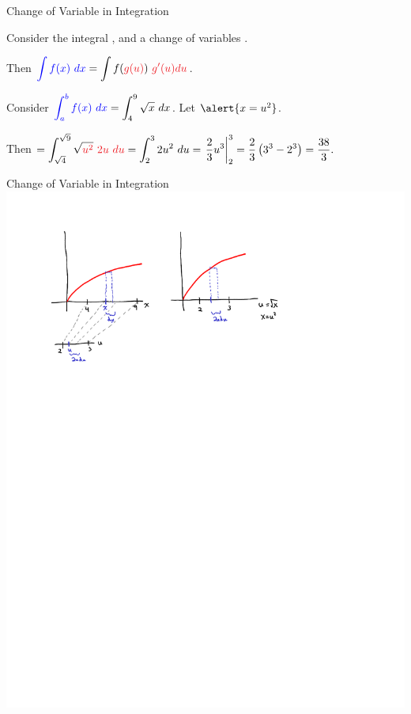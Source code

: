\documentclass[xcolor=dvipsnames,aspectratio=169,t]{beamer}
\begin{document}
\begin{frame}{Change of Variable in Integration}
  \bigskip
  
  Consider the integral , and a change of variables .
  \bigskip
  
  \pause
  \qquad Then $\displaystyle \colorb{\int f(x) \ dx}= \int f(\colorr{g(u)}) \ \colorr{g'(u) du}$.
  \vspace*{1.5em}
  
  \pause
  Consider $\displaystyle\textcolor{blue}{\int_a^b f(x) \ dx}=\int_4^9 \sqrt{x} \ dx$.
  Let $\alert{x=u^2}$.
  \medskip
  
  \quad Then $=\displaystyle \int_{\sqrt{4}}^{\sqrt{9}} \sqrt{\colorr{u^2}} \ \colorr{2u \ du}
              = \int_{2}^{3} 2u^2 \ du
              = \left. \frac{2}{3}u^3 \right|_{2}^{3}
              = \frac{2}{3}\left(3^3 - 2^3\right) = \frac{38}{3}.$
\end{frame}

\begin{frame}{Change of Variable in Integration}
  \includegraphics[clip,trim=1cm 0 0 5em]{images/ChangeOfVar.pdf}  %
\end{frame}
\end{document}
